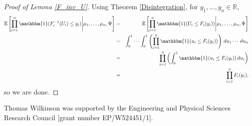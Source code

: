 \documentclass[aap]{imsart}
\theoremstyle{plain}
\theoremstyle{definition}
\begin{document}
\begin{appendix}
\begin{proof}[Proof of Lemma \ref{F_inv_U}]
  Using Theorem \ref{Disintegration}, for $y_1, \ldots, y_n \in \mathbb{R}$,
\begin{eqnarray*}
\mathbb{E}\left[ \prod_{i=1}^n \mathbbm{1}(F_i^{-1}(U_i) \leq y_i) \middle| \mu_1, \ldots, \mu_n, \Psi \right] & = & \mathbb{E}\left[ \prod_{i=1}^n \mathbbm{1}(U_i \leq F_i(y_i)) \middle| \mu_1, \ldots, \mu_n, \Psi \right] \\
    & = & \int_0^1 \cdots \int_0^1 \left( \prod_{i=1}^n \mathbbm{1}(u_i \leq F_i(y_i)) \right) \,d{u_1} \cdots \,d{u_n} \\
    & = & \prod_{i=1}^n \left( \int_0^1 \mathbbm{1}(u_i \leq F_i(y_i)) \,d{u_i} \right) \\
    & = & \prod_{i=1}^n F_i(y_i),
\end{eqnarray*}
so we are done.
\end{proof}
\end{appendix}

\begin{acks}[Acknowledgments]
  Thomas Wilkinson was supported by the Engineering and Physical Sciences Research Council [grant number EP/W524451/1].
\end{acks}



\end{document}
